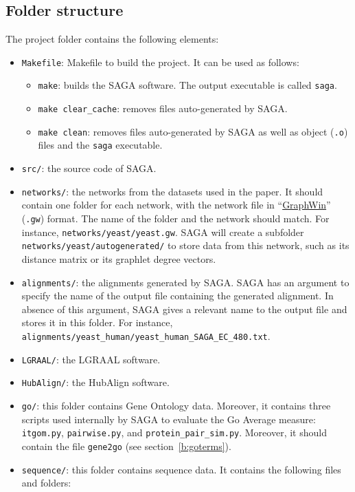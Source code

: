 \documentclass[]{article}
\begin{document}
\subsection{Folder structure}\label{b:struct}
The project folder contains the following elements:
\begin{itemize}
\item\verb|Makefile|: Makefile to build the project. It can be used as follows:
\begin{itemize}
\item\verb|make|: builds the SAGA software. The output executable is called \verb|saga|.
\item\verb|make clear_cache|: removes files auto-generated by SAGA. 
\item\verb|make clean|: removes files auto-generated by SAGA as well as object (\verb|.o|) files and the \verb|saga| executable.
\end{itemize}
\item\verb|src/|: the source code of SAGA.
\item\verb|networks/|: the networks from the datasets used in the paper. It should contain one folder for each network, with the network file in ``\href{http://www.algorithmic-solutions.info/leda_manual/gw.html}{GraphWin}'' (\verb'.gw') format. The name of the folder and the network should match. For instance, \verb|networks/yeast/yeast.gw|. SAGA will create a subfolder\\ \verb|networks/yeast/autogenerated/| to store data from this network, such as its distance matrix or its graphlet degree vectors.
\item\verb|alignments/|: the alignments generated by SAGA. SAGA has an argument to specify the name of the output file containing the generated alignment. In absence of this argument, SAGA gives a relevant name to the output file and stores it in this folder. For instance,\\ \verb|alignments/yeast_human/yeast_human_SAGA_EC_480.txt|.
\item\verb|LGRAAL/|: the LGRAAL software.
\item\verb|HubAlign/|: the HubAlign software.
\item\verb|go/|: this folder contains Gene Ontology data. Moreover, it contains three scripts used internally by SAGA to evaluate the Go Average measure: \texttt{itgom.py}, \texttt{pairwise.py}, and \texttt{protein\_pair\_sim.py}. Moreover, it should contain the file \texttt{gene2go} (see section~\ref{b:goterms}).
\item\verb|sequence/|: this folder contains sequence data. It contains the following files and folders:

\end{itemize}
\end{document}

